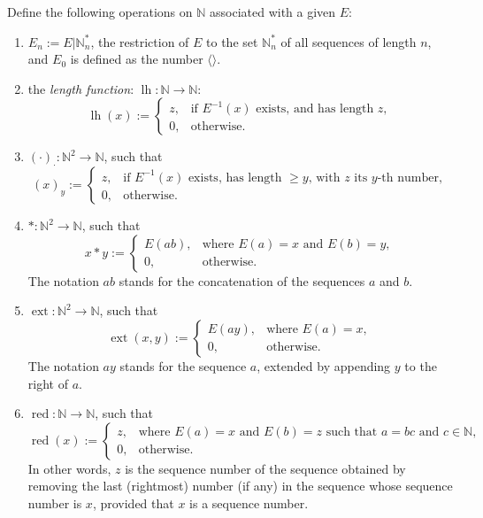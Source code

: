 \documentclass[12pt]{article}
\begin{document}
Define the following operations on $\mathbb{N}$ associated with a given $E$:
\begin{enumerate}
\item $E_n := E | \mathbb{N}^*_n$, the restriction of $E$ to the set $\mathbb{N}^*_n$ of all sequences of length $n$, and $E_0$ is defined as the number $\langle \rangle$.
\item the \emph{length function}: $\operatorname{lh}: \mathbb{N} \to \mathbb{N}$:
\begin{displaymath}
\operatorname{lh}(x) := \left\{
\begin{array}{ll}
z , & \textrm{if }E^{-1}(x)\textrm{ exists, and has length }z, \\
0 , & \textrm{otherwise}.
\end{array}
\right.
\end{displaymath}
\item $(\cdot)_{\cdot}: \mathbb{N}^2\to \mathbb{N}$, such that 
\begin{displaymath}
(x)_y := \left\{
\begin{array}{ll}
z , & \textrm{if }E^{-1}(x)\textrm{ exists, has length }\ge y\textrm{, with }z\textrm{ its }y\textrm{-th number}, \\
0 , & \textrm{otherwise}.
\end{array}
\right.
\end{displaymath}
\item $*: \mathbb{N}^2 \to \mathbb{N}$, such that 
\begin{displaymath}
x * y := \left\{
\begin{array}{ll}
E(ab) , & \textrm{where }E(a)=x \textrm{ and }E(b)=y, \\
0 , & \textrm{otherwise}.
\end{array}
\right.
\end{displaymath}
The notation $ab$ stands for the concatenation of the sequences $a$ and $b$.
\item $\operatorname{ext} : \mathbb{N}^2 \to \mathbb{N}$, such that 
\begin{displaymath}
\operatorname{ext}(x,y) := \left\{
\begin{array}{ll}
E(ay) , & \textrm{where }E(a)=x , \\
0 , & \textrm{otherwise}.
\end{array}
\right.
\end{displaymath}
The notation $ay$ stands for the sequence $a$, extended by appending $y$ to the right of $a$.
\item $\operatorname{red} : \mathbb{N} \to \mathbb{N}$, such that 
\begin{displaymath}
\operatorname{red}(x) := \left\{
\begin{array}{ll}
z , & \textrm{where }E(a)=x \textrm{ and }E(b)=z \textrm{ such that }a=bc\textrm{ and }c\in \mathbb{N}, \\
0 , & \textrm{otherwise}.
\end{array}
\right.
\end{displaymath}
In other words, $z$ is the sequence number of the sequence obtained by removing the last (rightmost) number (if any) in the sequence whose sequence number is $x$, provided that $x$ is a sequence number.
\end{enumerate}
\end{document}
